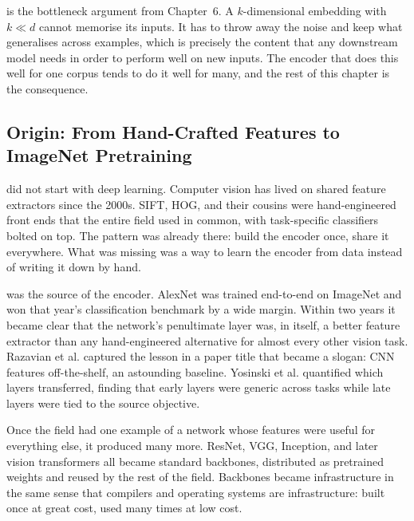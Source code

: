 is the bottleneck argument from Chapter~6. A $k$-dimensional embedding with $k \ll d$ cannot memorise its inputs. It has to throw away the noise and keep what generalises across examples, which is precisely the content that any downstream model needs in order to perform well on new inputs. The encoder that does this well for one corpus tends to do it well for many, and the rest of this chapter is the consequence.

\subsection{Origin: From Hand-Crafted Features to ImageNet Pretraining}


 did not start with deep learning. Computer vision has lived on shared feature extractors since the 2000s. SIFT, HOG, and their cousins were hand-engineered front ends that the entire field used in common, with task-specific classifiers bolted on top. The pattern was already there: build the encoder once, share it everywhere. What was missing was a way to learn the encoder from data instead of writing it down by hand.

 was the source of the encoder. AlexNet\cite{Krizhevsky2012} was trained end-to-end on ImageNet and won that year's classification benchmark by a wide margin. Within two years it became clear that the network's penultimate layer was, in itself, a better feature extractor than any hand-engineered alternative for almost every other vision task. Razavian et al.\cite{Razavian2014} captured the lesson in a paper title that became a slogan: CNN features off-the-shelf, an astounding baseline. Yosinski et al.\cite{Yosinski2014} quantified which layers transferred, finding that early layers were generic across tasks while late layers were tied to the source objective.

 Once the field had one example of a network whose features were useful for everything else, it produced many more. ResNet, VGG, Inception, and later vision transformers\cite{Dosovitskiy2020ViT} all became standard backbones, distributed as pretrained weights and reused by the rest of the field. Backbones became infrastructure in the same sense that compilers and operating systems are infrastructure: built once at great cost, used many times at low cost.

